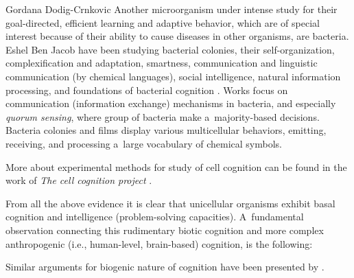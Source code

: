 \begin{artengenv}{Gordana Dodig-Crnkovic}
Another microorganism under intense study for their goal-directed, efficient learning and adaptive behavior, which are of special interest because of their ability to cause diseases in other organisms, are bacteria. Eshel Ben Jacob have been studying bacterial colonies, their self-organization, complexification and adaptation, smartness, communication and linguistic communication (by chemical languages), social intelligence, natural information processing, and foundations of bacterial cognition
\parencites[][]{ben-jacob_bacterial_1998}[][]{ben-jacob_bacterial_2003}[][]{ben-jacob_social_2008}[][]{ben-jacob_learning_2009}[][]{ben-jacob_bacteria_2004}[][]{ben-jacob_seeking_2006}[][]{ben-jacob_smart_2011}. %
 Works 
\parencites[][]{witzany_introduction_2011}[][]{schauder_languages_2001}[][]{waters_quorum_2005}[][]{ng_bacterial_2009} %
 focus on communication (information exchange) mechanisms in bacteria, and especially \textit{quorum sensing}, where group of bacteria make a~majority-based decisions. Bacteria colonies and films display various multicellular behaviors, emitting, receiving, and processing a~large vocabulary of chemical symbols.

More about experimental methods for study of cell cognition can be found in the work of \textit{The cell cognition project}
\parencite[][]{held_cellcognition_2010}.%


From all the above evidence it is clear that unicellular organisms exhibit basal cognition and intelligence (problem-solving capacities). A~fundamental observation connecting this rudimentary biotic cognition and more complex anthropogenic (i.e., human-level, brain-based) cognition, is the following:

Similar arguments for biogenic nature of cognition have been presented by
\parencites[][]{levin_basal_2021}[][]{yuste_new_2021}[][]{lyon_basal_2021}.%



\end{artengenv}
